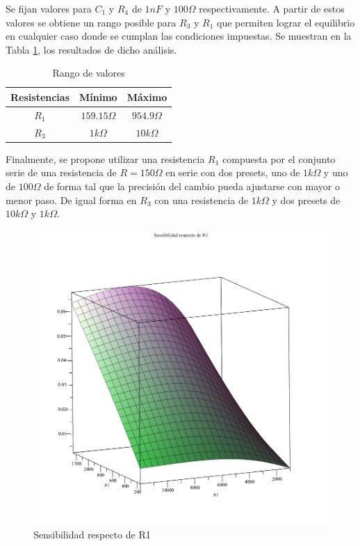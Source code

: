 Se fijan valores para $C_1$ y $R_4$ de $1nF$ y $100\Omega$ respectivamente. A partir de estos valores se obtiene un rango posible para $R_3$ y $R_1$ que permiten lograr el equilibrio en cualquier caso donde se cumplan las condiciones impuestas. Se muestran en la Tabla \ref{table:Rangos_pot}, los resultados de dicho an\'alisis. 

\begin{table}[H]
\centering
\begin{tabular}{ccc}
\hline
Resistencias & M\'inimo & M\'aximo \\ \hline
$R_1$ & $159.15 \Omega$ & $954.9 \Omega$ \\
$R_3 $& $1 k\Omega$ & $10 k\Omega$ \\
\end{tabular}
\caption{Rango de valores }
\label{table:Rangos_pot}
\end{table}

Finalmente, se propone utilizar una resistencia $R_1$ compuesta por el conjunto serie de una resistencia de $R = 150 \Omega$ en serie con dos presets, uno de $1k\Omega$ y uno de $100\Omega$ de forma tal que la precisi\'on del cambio pueda ajustarse con mayor o menor paso. De igual forma en $R_3$ con una resistencia de $1k \Omega$ y dos presets de $10k\Omega$ y $1k \Omega$.

\begin{figure}[H]
    \centering
    \includegraphics[scale=0.4]{Recursos/cserie_sensibilidad_r1.png}
    \caption{Sensibilidad respecto de R1}
    \label{fig:sensibilidad_r1}
\end{figure}

